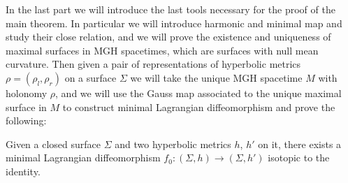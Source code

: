 In the last part we will introduce the last tools necessary for the proof of the main theorem. In particular we will introduce harmonic and minimal map and study their close relation, and we will prove the existence and uniqueness of maximal surfaces in MGH spacetimes, which are surfaces with null mean curvature. Then given a pair of representations of hyperbolic metrics $\rho=(\rho_l, \rho_r)$ on a surface $\Sigma$ we will take the unique MGH spacetime $M$ with holonomy $\rho$, and we will use the Gauss map associated to the unique maximal surface in $M$ to construct minimal Lagrangian diffeomorphism and prove the following:
\begin{theorem*}
    Given a closed surface $\Sigma$ and two hyperbolic metrics $h$, $h'$ on it, there exists a minimal Lagrangian diffeomorphism $f_0 : (\Sigma,h) \to (\Sigma,h')$ isotopic to the identity.
\end{theorem*}